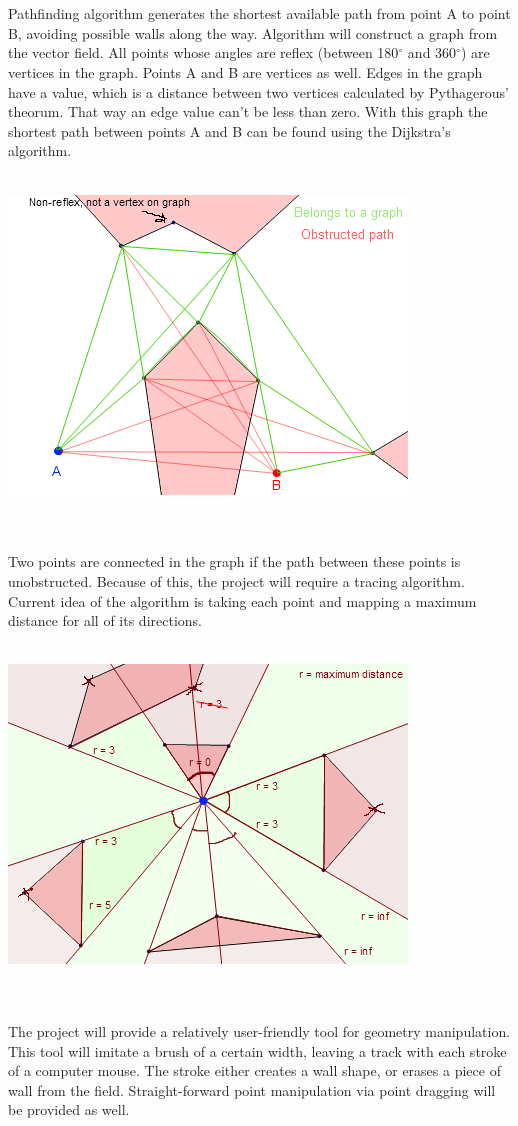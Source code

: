 \documentclass[a4paper,12pt]{article}
\begin{document}
\\
\\
Pathfinding algorithm generates the shortest available path from point A to point B,
avoiding possible walls along the way. Algorithm will construct a graph from the vector field.
All points whose angles are reflex (between 180$^\circ$ and 360$^\circ$) are vertices in the graph. Points A and B are vertices as well. Edges in the graph have a value, which is a distance between two vertices calculated by Pythagerous' theorum. That way an edge value can't be less than zero. With this graph the shortest path between points A and B can be found using the Dijkstra's algorithm.
\\
\\
\centerline{\includegraphics[scale=0.65]{graph.png}} \hspace*{\fill}
\\
\\
Two points are connected in the graph if the path between these points is unobstructed.
Because of this, the project will require a tracing algorithm. Current idea of the algorithm is taking each point and mapping a maximum distance for all of its directions.
\\
\\
\centerline{\includegraphics[scale=0.6]{trace.png}} \hspace*{\fill}
\\
\\
The project will provide a relatively user-friendly tool for geometry manipulation. This tool will imitate a brush of a certain width, leaving a track with each stroke of a computer mouse. The stroke either creates a wall shape, or erases a piece of wall from the field. Straight-forward point manipulation via point dragging will be provided as well.
\end{document}
